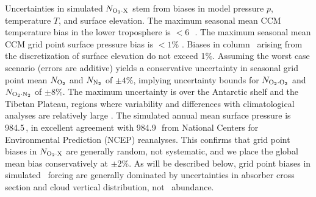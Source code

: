 \documentclass[agupp,twoside]{aguplus} %
\begin{document}
Uncertainties in simulated $N_{\mathrm{O}_{2} \cdot \mathrm{X}}$ stem from biases in model
pressure $p$, temperature $T$, and surface elevation.
The maximum seasonal mean CCM temperature bias in the lower
troposphere is $< 6$\,\K\ \cite[]{HKH98}.
The maximum seasonal mean CCM grid point surface pressure bias is 
$< 1\%$ \cite[]{HHB98}. 
Biases in column \Od\ arising from the discretization of surface
elevation do not exceed 1\%.  
Assuming the worst case scenario (errors are additive) yields a
conservative uncertainty in seasonal grid point mean $N_{\mathrm{O}_{2}}$ and
$N_{\mathrm{N}_{2}}$ of $\pm 4\%$, implying uncertainty bounds for $N_{\mathrm{O}_{2} \cdot \mathrm{O}_{2}}$ and
$N_{\mathrm{O}_{2} \cdot \mathrm{N}_{2}}$ of $\pm 8\%$. 
The maximum uncertainty is over the Antarctic shelf and the
Tibetan Plateau, regions where variability and differences with
climatological analyses are relatively large \cite[]{HHB98}.
The simulated annual mean surface pressure is 984.5\,\mb, in excellent
agreement with 984.9\,\mb\ from National Centers for Environmental
Prediction (NCEP) reanalyses.  
This confirms that grid point biases in $N_{\mathrm{O}_{2} \cdot \mathrm{X}}$ are generally random,
not systematic, and we place the global mean bias conservatively at
$\pm 2\%$.   
As will be described below, grid point biases in simulated \OdX\
forcing are generally dominated by uncertainties in absorber
cross section and cloud vertical distribution, not \OdX\ abundance.   
\end{document}
